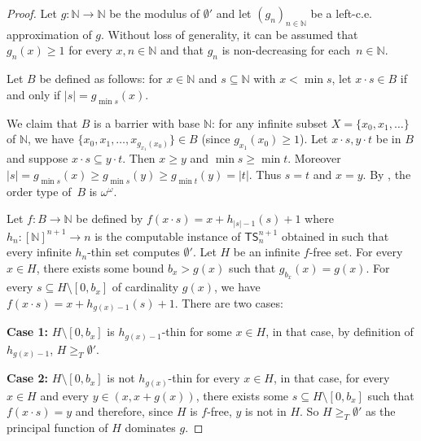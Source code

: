 \documentclass{article}
\newcommand{\TS}[0]{\mathsf{TS}}
\newcommand{\NN}[0]{\mathbb{N}}
\numberwithin{theorem}{section}
\newcommand{\ludovic}[1]{\textcolor{blue}{#1}}
\newcommand{\lorenzo}[1]{\textcolor{orange}{#1}}
\begin{document}
\begin{proof}
Let $g : \NN \to \NN$ be the modulus of $\emptyset'$ and let $(g_n)_{n \in \NN}$ be a left-c.e. approximation of $g$. Without loss of generality, it can be assumed that $g_{n}(x) \geq 1$ for every $x,n \in \NN$ and that $g_n$ is non-decreasing for each~$n \in \NN$.

Let $B$ be defined as follows: for $x \in \NN$ and $s \subseteq \NN$ with $x < \min s$, let $x \cdot s \in B$ if and only if $|s| = g_{\min s}(x)$. 


We claim that $B$ is a barrier with base $\NN$: for any infinite subset $X = \{x_0, x_1, \dots\}$ of $\NN$, we have $\{x_0, x_1, \dots, x_{g_{x_1}(x_0)}\}\in B$ (since $g_{x_1}(x_0)\geq 1$). Let $x \cdot s, y \cdot t$ be in $B$ and suppose $x\cdot s \subseteq y \cdot t$.
Then $x \geq y$ and $\min s \geq \min t$. Moreover $|s| = g_{\min s}(x) \geq g_{\min s}(y)\geq g_{\min t}(y) = |t|$. Thus $s = t$ and $x=y$. By , the order type of~$B$ is $\omega^{\omega}$.

Let $f : B \to \NN$ be defined by $f(x \cdot s) = x + h_{|s| - 1}(s) + 1$ where $h_n : [\NN]^{n+1} \to n$ is the computable instance of $\TS^{n+1}_n$ obtained in  such that every infinite $h_n$-thin set computes $\emptyset'$. 
Let $H$ be an infinite $f$-free set. For every $x \in H$, there exists some bound $b_x > g(x)$ such that $g_{b_x}(x) = g(x)$. For every $s \subseteq H \setminus [0,b_x]$ of cardinality $g(x)$, we have $f(x \cdot s) = x + h_{g(x) - 1}(s) + 1$. There are two cases:
\smallskip

\textbf{Case 1:} $H \setminus [0,b_x]$ is $h_{g(x) - 1}$-thin for some $x \in H$, in that case, by definition of $h_{g(x) - 1}$, $H \geq_T \emptyset'$.
\smallskip

\textbf{Case 2:} $H \setminus [0,b_x]$ is not $h_{g(x)}$-thin for every $x \in H$, in that case, for every $x \in H$ and every $y \in (x,x + g(x))$, there exists some $s \subseteq H \setminus [0,b_x]$ such that $f(x \cdot s) = y$ and therefore, since $H$ is $f$-free, $y$ is not in $H$. So $H \geq_T \emptyset'$ as the principal function of $H$ dominates $g$.
\end{proof}
\end{document}
